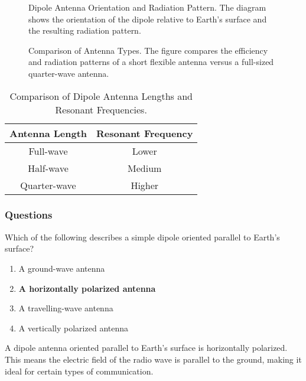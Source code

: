 \begin{figure}[h!]
    \centering
    \caption{Dipole Antenna Orientation and Radiation Pattern. The diagram shows the orientation of the dipole relative to Earth's surface and the resulting radiation pattern.}
    \label{fig:dipole-orientation}
\end{figure}

\begin{figure}[h!]
    \centering
    \caption{Comparison of Antenna Types. The figure compares the efficiency and radiation patterns of a short flexible antenna versus a full-sized quarter-wave antenna.}
    \label{fig:antenna-comparison}
\end{figure}

\begin{table}[h!]
    \centering
    \begin{tabular}{|c|c|}
        \hline
        \textbf{Antenna Length} & \textbf{Resonant Frequency} \\
        \hline
        Full-wave & Lower \\
        Half-wave & Medium \\
        Quarter-wave & Higher \\
        \hline
    \end{tabular}
    \caption{Comparison of Dipole Antenna Lengths and Resonant Frequencies.}
    \label{tab:dipole-lengths}
\end{table}

\subsubsection*{Questions}

\begin{tcolorbox}[colback=gray!10!white,colframe=black!75!black,title={T9A03}]
    Which of the following describes a simple dipole oriented parallel to Earth's surface?
    \begin{enumerate}[label=\Alph*),noitemsep]
        \item A ground-wave antenna
        \item \textbf{A horizontally polarized antenna}
        \item A travelling-wave antenna
        \item A vertically polarized antenna
    \end{enumerate}
\end{tcolorbox}
A dipole antenna oriented parallel to Earth's surface is horizontally polarized. This means the electric field of the radio wave is parallel to the ground, making it ideal for certain types of communication.

